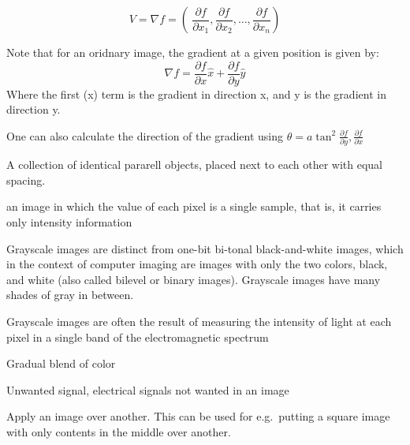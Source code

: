 \begin{definition}
    $$
        V = \nabla{f} = \left(\
        \frac{\partial{f}}{\partial{x_{1}}},
        \frac{\partial{f}}{\partial{x_{2}}},
        \dots,
        \frac{\partial{f}}{\partial{x_{n}}}
    \right)
    $$

    Note that for an oridnary image, the gradient at a given position is 
    given by:
    $$
    \nabla{f} = 
    \frac{\partial{f}}{\partial{x}}\hat{x} +
    \frac{\partial{f}}{\partial{y}}\hat{y}
    $$
    Where the first (x) term is the gradient in direction x, and y is the
    gradient in direction y.

    One can also calculate the direction of the gradient using
    $\theta = a\tan^{2}{\frac{\partial{f}}{\partial{y}}, \frac{\partial{f}}{\partial{x}}}$
\end{definition}

\begin{definition}[Grating]
    A collection of identical pararell objects, placed next to each other with
    equal spacing.
    \end{definition}
\begin{definition}[Grayscale]
    an image in which the value of each pixel is a single sample, that is, it
    carries only intensity information

    Grayscale images are distinct from one-bit bi-tonal black-and-white images,
    which in the context of computer imaging are images with only the two
    colors, black, and white (also called bilevel or binary images). Grayscale
    images have many shades of gray in between.

    Grayscale images are often the result of measuring the intensity of light
    at each pixel in a single band of the electromagnetic spectrum 

\end{definition}

\begin{definition}
    Gradual blend of color
\end{definition}

\begin{definition}
    Unwanted signal, electrical signals not wanted in an image
\end{definition}

\begin{definition}
    Apply an image over another. This can be used for e.g.\ putting a square image
    with only contents in the middle over another.
\end{definition}

